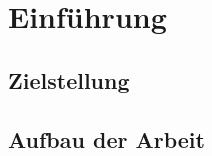 \chapter{Einführung}
\label{ch:Einfuehrung}
\lipsum[1-3]





\section{Zielstellung}
\label{sec:Zielstellung}
\lipsum[1-2]





\section{Aufbau der Arbeit}
\label{sec:Aufbau der Arbeit}
\lipsum[1]





